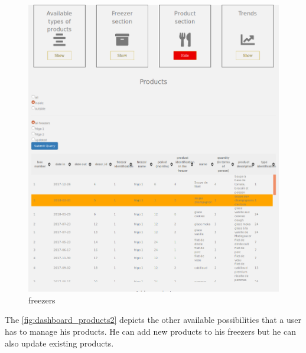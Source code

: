 \begin{figure}[H]
\centering
\includegraphics[scale=0.35]{./images/dashboard_products1.png}
\caption{freezers}
\label{fig:dashboard_products1}
\end{figure}

The \autoref{fig:dashboard_products2} depicts the other available possibilities that a user has to manage his products. He can add new products to his freezers but he can also update existing products.

